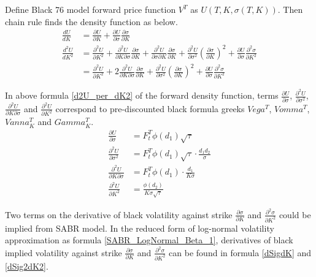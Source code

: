\documentclass{article}
\begin{document}
Define Black 76 model forward price function $ V^T $ as $ U\left(T, K, \sigma(T, K)\right) $.
Then chain rule finds the density function as below.
\begin{align}
    \frac{d U}{d K} &= \frac{\partial U}{\partial K} + \frac{\partial U}{\partial \sigma} \frac{\partial \sigma}{\partial K} \\
    \frac{d^2 U}{d K^2} &= \frac{\partial^2 U}{\partial K^2} + \frac{\partial^2 U}{\partial K \partial \sigma} \frac{\partial \sigma}{\partial K}  + \frac{\partial^2 U}{\partial \sigma \partial K} \frac{\partial \sigma}{\partial K} + \frac{\partial^2 U}{\partial \sigma^2} \left(\frac{\partial \sigma}{\partial K}\right)^2 + \frac{\partial U}{\partial \sigma} \frac{\partial^2 \sigma}{\partial K^2} \nonumber \\
    &= \frac{\partial^2 U}{\partial K^2} + 2 \frac{\partial^2 U}{\partial K \partial \sigma} \frac{\partial \sigma}{\partial K} + \frac{\partial^2 U}{\partial \sigma^2} \left(\frac{\partial \sigma}{\partial K}\right)^2 + \frac{\partial U}{\partial \sigma} \frac{\partial^2 \sigma}{\partial K^2} \label{d2U_per_dK2}
\end{align}

In above formula \ref{d2U_per_dK2} of the forward density function, terms $ \frac{\partial U}{\partial \sigma} $, $ \frac{\partial^2 U}{\partial \sigma^2} $, $ \frac{\partial^2 U}{\partial K \partial \sigma} $ and $ \frac{\partial^2 U}{\partial K^2} $ correspond to pre-discounted black formula greeks $ Vega^T $, $ Vomma^T $, $ Vanna_{K}^T $ and $ Gamma_{K}^T $.
\begin{subequations}
    \begin{align}
        \frac{\partial U}{\partial \sigma} &= F_{t}^{T} \phi(d_1) \sqrt{\tau} \\
        \frac{\partial^2 U}{\partial \sigma^2} &= F_{t}^{T} \phi(d_1) \sqrt{\tau} \cdot \frac{d_1 d_2}{\sigma} \\
        \frac{\partial^2 U}{\partial K \partial \sigma} &= F_{t}^{T} \phi(d_1) \cdot \frac{d_1}{K \sigma} \\
        \frac{\partial^2 U}{\partial K^2} &= \frac{\phi(d_2)}{K \sigma \sqrt{\tau}}
    \end{align}
\end{subequations}

Two terms on the derivative of black volatility against strike $ \frac{\partial \sigma}{\partial K} $ and $ \frac{\partial^2 \sigma}{\partial K^2} $ could be implied from SABR model.
In the reduced form of log-normal volatility approximation as formula \ref{SABR_LogNormal_Beta_1}, derivatives of black implied volatility against strike $ \frac{\partial \sigma}{\partial K} $ and $ \frac{\partial^2 \sigma}{\partial K^2} $ can be found in formula \ref{dSigdK} and \ref{dSig2dK2}.
\end{document}
